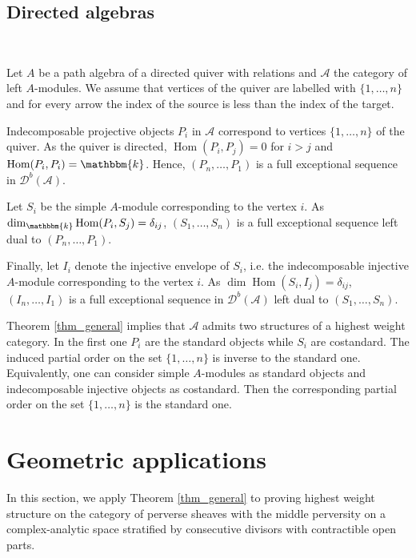 \documentclass[12pt,a4paper]{amsart}
\newcommand{\aA}{{\mathcal{A}}}
\newcommand{\dD}{{\mathcal{D}}}
\newcommand{\kk}{\mathbbm{k}}
\newcommand{\Hom}{\mathop{\textrm{Hom}}\nolimits}
\theoremstyle{definition}
\begin{document}
\vspace{0.3cm}
\subsection{Directed algebras}~\\ \label{ssec_dir_alg}

Let $A$ be a path algebra of a directed quiver  with relations and $\aA$ the category of left $A$-modules. We assume that vertices of the quiver are labelled with $\{1,\ldots,n\}$ and for every arrow the index of the source is less than the index of the target.

Indecomposable projective objects $P_i$ in $\aA$ correspond to vertices $\{1,\ldots,n\}$ of the quiver. As the quiver is directed, $\Hom(P_i,P_j) = 0$ for $i>j$ and $\Hom(P_i,P_i)=\kk$. Hence, $(P_n,\ldots,P_1)$ is a full exceptional sequence in $\dD^b(\aA)$. 

Let $S_i$ be the simple $A$-module corresponding to the vertex $i$. As $\dim_{\kk} \Hom(P_i,S_j) = \delta_{ij}$, $(S_1,\ldots,S_n)$ is a full exceptional sequence left dual to $(P_n,\ldots,P_1)$. 

Finally, let $I_i$ denote the injective envelope of $S_i$, i.e. the indecomposable injective $A$-module corresponding to the vertex $i$. As $\dim \Hom(S_i,I_j) = \delta_{ij}$, $(I_n,\ldots,I_1)$ is a full exceptional sequence in $\dD^b(\aA)$ left dual to $(S_1,\ldots, S_n)$.

Theorem \ref{thm_general} implies that $\aA$ admits two structures of a highest weight category. In the first one $P_i$ are the  standard objects while $S_i$ are costandard. The induced partial order on the set $\{1,\ldots,n\}$ is inverse to the standard one. Equivalently, one can consider simple $A$-modules as standard objects and indecomposable injective objects as costandard. Then the corresponding partial order on the set $\{1,\ldots,n\}$ is the standard one.




\vspace{0.3cm}
\section{Geometric applications}

In this section, we apply Theorem \ref{thm_general} to proving highest weight structure on the category of perverse sheaves with the middle perversity on a complex-analytic space stratified by consecutive divisors with contractible open parts. 
\end{document}
